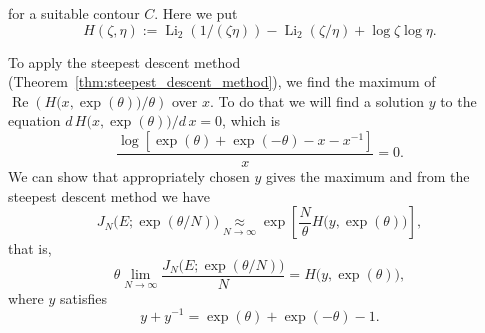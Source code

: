 \documentclass{amsart}
\newcommand{\Li}{\operatorname{Li}}
\renewcommand{\Re}{\operatorname{Re}}
\theoremstyle{definition}
\theoremstyle{remark}
\numberwithin{equation}{section}
\begin{document}
for a suitable contour $C$.
Here we put
\begin{equation}\label{eq:H}
  H(\zeta,\eta)
  :=
  \Li_2(1/(\zeta\eta))-\Li_2(\zeta/\eta)+\log{\zeta}\log{\eta}.
\end{equation}
\par
To apply the steepest descent method (Theorem~\ref{thm:steepest_descent_method}), we find the maximum of $\Re\left(H\bigl(x,\exp(\theta)\bigr)/\theta\right)$ over $x$.
To do that we will find a solution $y$ to the equation $d\,H\bigl(x,\exp(\theta)\bigr)/d\,x=0$, which is
\begin{equation*}
  \frac{\log\left[\exp(\theta)+\exp(-\theta)-x-x^{-1}\right]}{x}
  =0.
\end{equation*}
We can show that appropriately chosen $y$ gives the maximum and from the steepest descent method we have
\begin{equation*}
  J_N\bigl(E;\exp(\theta/N)\bigr)
  \underset{N\to\infty}{\approx}
  \exp
  \left[
    \frac{N}{\theta}
    H\bigl(y,\exp(\theta)\bigr)
  \right],
\end{equation*}
that is,
\begin{equation}\label{eq:GVC_limit}
  \theta
  \lim_{N\to\infty}
  \frac{J_N\bigl(E;\exp(\theta/N)\bigr)}{N}
  =
  H\bigl(y,\exp(\theta)\bigr),
\end{equation}
where $y$ satisfies
\begin{equation*}
  y+y^{-1}
  =
  \exp(\theta)+\exp(-\theta)-1.
\end{equation*}
\end{document}
